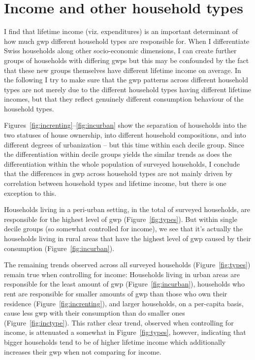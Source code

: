 \documentclass[a4paper,11pt,abstract=true]{scrartcl}
\begin{document}


\clearpage

\section{Income and other household types}
\label{app:cross}

I find that lifetime income (viz. expenditures) is an important determinant of how much \ac{gwp} different household types are responsible for.
When I differentiate Swiss households along other socio-economic dimensions, I can create further groups of households with differing \acp{gwp} but this may be confounded by the fact that these new groups themselves have different lifetime income on average.
In the following I try to make sure that the \ac{gwp} patterns across different household types are not merely due to the different household types having different lifetime incomes, but that they reflect genuinely different consumption behaviour of the household types.

Figures~\ref{fig:increnting}--\ref{fig:incurban} show the separation of households into the two statuses of house ownership, into different household compositions, and into different degrees of urbanization -- but this time within each decile group.
Since the differentiation within decile groups yields the similar trends as does the differentiation within the whole population of surveyed households, I conclude that the differences in \ac{gwp} across household types are not mainly driven by correlation between household types and lifetime income, but there is one exception to this.

Households living in a peri-urban setting, in the total of surveyed households, are responsible for the highest level of \ac{gwp} (Figure~\ref{fig:types}).
But within single decile groups (so somewhat controlled for income), we see that it's actually the households living in rural areas that have the highest level of \ac{gwp} caused by their consumption (Figure~\ref{fig:incurban}).

The remaining trends observed across all surveyed households (Figure~\ref{fig:types}) remain true when controlling for income:
Households living in urban areas are responsible for the least amount of \ac{gwp} (Figure~\ref{fig:incurban}), households who rent are responsible for smaller amounts of \ac{gwp} than those who own their residence (Figure~\ref{fig:increnting}), and larger households, on a per-capita basis, cause less \ac{gwp} with their consumption than do smaller ones (Figure~\ref{fig:inctype}).
This rather clear trend, observed when controlling for income, is attenuated a somewhat in Figure~\ref{fig:types}, however, indicating that bigger households tend to be of higher lifetime income which additionally increases their \ac{gwp} when not comparing for income.
\end{document}
